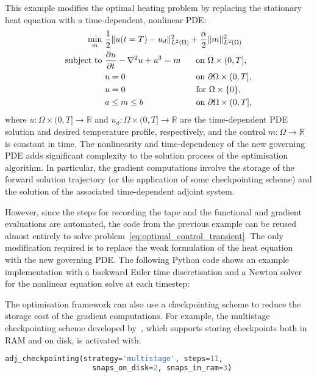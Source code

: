\documentclass[prodmode,acmtoms]{acmsmall}
\begin{document}
This example modifies the optimal heating problem by replacing the stationary heat equation with a time-dependent, nonlinear PDE:
\begin{equation}
\begin{aligned}
\min_m~&\frac{1}{2} \| u(t=T) - u_d \|^2_{L^2(\Omega)} + \frac{\alpha}{2} \| m \|^2_{L^2({\Omega})} \\ 
 \textrm{subject to } 
 & \frac{\partial u}{\partial t} -\nabla^2 u + u^3 = m \hspace{0.5cm} \textrm{ on } \Omega \times (0, T], \\ 
 & u = 0 \hspace{2.8cm} \textrm{ on } \partial \Omega \times (0, T],  \\
 & u = 0 \hspace{2.8cm} \textrm{ for } \Omega \times \{0\},  \\
 & a  \le m \le b \hspace{2.07cm} \textrm{ on } \partial \Omega \times (0, T],
\end{aligned}\label{eq:optimal_control_transient}\end{equation}
where $u: \Omega \times (0, T] \to \mathbb R$ and $u_d: \Omega \times (0, T] \to \mathbb R$ are the time-dependent PDE solution and desired temperature profile, respectively, 
and the control $m: \Omega \to \mathbb R$ is constant in time.
The nonlinearity and time-dependency of the new governing PDE
adds significant complexity to the solution process of the optimisation algorithm.
In particular, the gradient computations involve the storage of the forward solution trajectory (or the application of some checkpointing scheme) and 
the solution of the associated time-dependent adjoint system. 

However, since the steps for recording the tape and the functional and gradient evaluations are automated,
the code from the previous example can be reused almost entirely to solve problem~\eqref{eq:optimal_control_transient}. 
The only modification required is to replace the weak formulation of the heat equation with the new governing PDE. 
The following Python code shows an example implementation with a backward Euler time discretisation and a Newton solver for the nonlinear equation solve at each timestep:


The optimisation framework can also use a checkpointing scheme to reduce the storage cost of the gradient computations.
For example, the multistage checkpointing scheme developed by~, which supports storing checkpoints both in RAM and on disk, is activated with:
\begin{lstlisting}[language=Python,numbers=none]
adj_checkpointing(strategy='multistage', steps=11, 
                    snaps_on_disk=2, snaps_in_ram=3)
\end{lstlisting}
\end{document}
